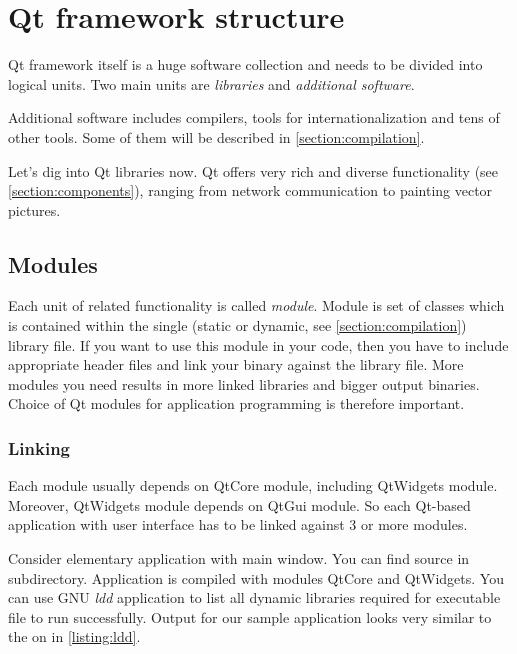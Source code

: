 \chapter{Qt framework structure}\label{section:qtstructure}
Qt framework itself is a huge software collection and needs to be divided into logical units. Two main units are \textit{libraries} and \textit{additional software}.

Additional software includes compilers, tools for internationalization and tens of other tools. Some of them will be described in \autoref{section:compilation}.

Let's dig into Qt libraries now. Qt offers very rich and diverse functionality (see \autoref{section:components}), ranging from network communication to painting vector pictures.

\section{Modules}
Each unit of related functionality is called \textit{module}. Module is set of classes which is contained within the single (static or dynamic, see \autoref{section:compilation}) library file. If you want to use this module in your code, then you have to include appropriate header files and link your binary against the library file. More modules you need results in more linked libraries and bigger output binaries. Choice of Qt modules for application programming is therefore important.

\subsection{Linking}\label{listing:linking}
Each module usually depends on QtCore module, including QtWidgets module. Moreover, QtWidgets module depends on QtGui module. So each Qt-based application with user interface has to be linked against 3 or more modules.

Consider elementary  application with main window. You can find source in subdirectory. Application is compiled with modules QtCore and QtWidgets. You can use GNU \textit{ldd} application to list all dynamic libraries required for executable file to run successfully. Output for our sample application looks very similar to the on in \autoref{listing:ldd}.

